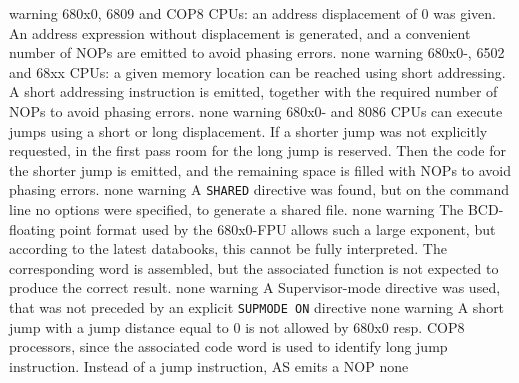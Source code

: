 \documentclass[12pt,twoside]{report}
\newcommand{\tty}[1]{{\tt #1}}
\begin{document}
\begin{description}
               {warning}
               {680x0, 6809 and COP8 CPUs: an address displacement of 0 was
                given.  An address expression without displacement is
                generated, and a convenient number of NOPs are emitted
                to avoid phasing errors.}
               {none}
               {warning}
               {680x0-, 6502 and 68xx CPUs: a given memory location can be
                reached using short addressing. A short addressing
                instruction is emitted, together with the required
                number of NOPs to avoid phasing errors.}
               {none}
               {warning}
               {680x0- and 8086 CPUs can execute jumps using a short or long
                displacement. If a shorter jump was not explicitly
                requested, in the
                first pass room for the long jump is reserved. Then the code
                for the shorter jump is emitted, and the remaining space is
                filled with NOPs to avoid phasing errors.}
               {none}
               {warning}
               {A \tty{SHARED} directive was found, but on the command line no
                options were specified, to generate a shared file.}
               {none}
               {warning}
               {The BCD-floating point format used by the 680x0-FPU
                allows such a large exponent, but according to the latest
                databooks, this cannot be fully interpreted. The
                corresponding word is assembled, but the associated
                function is not expected to produce the correct result.}
               {none}
               {warning}
               {A Supervisor-mode directive was used, that was not preceded
                by an explicit \tty{SUPMODE ON} directive}
               {none}
               {warning}
               {A short jump with a jump distance equal to 0 is not allowed
                by 680x0 resp. COP8 processors, since the associated code word is
                used to identify long jump instruction. Instead of a
                jump instruction, AS emits a NOP}
               {none}

\end{description}
\end{document}
